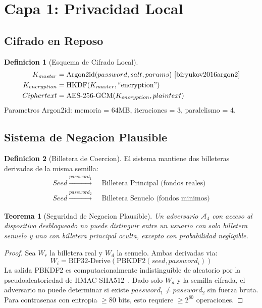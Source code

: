\documentclass[11pt]{article}
\theoremstyle{definition}
\newtheorem{definicion}{Definicion}[section]
\theoremstyle{plain}
\newtheorem{teorema}{Teorema}[section]
\theoremstyle{remark}
\begin{document}
\section{Capa 1: Privacidad Local}
\label{sec:layer1}

\subsection{Cifrado en Reposo}

\begin{definicion}[Esquema de Cifrado Local]
\begin{align}
K_{master} &= \text{Argon2id}(password, salt, params)~\cite{biryukov2016argon2} \\
K_{encryption} &= \text{HKDF}(K_{master}, \text{``encryption''}) \\
Ciphertext &= \text{AES-256-GCM}(K_{encryption}, plaintext)
\end{align}
Parametros Argon2id: memoria = 64MB, iteraciones = 3, paralelismo = 4.
\end{definicion}

\subsection{Sistema de Negacion Plausible}

\begin{definicion}[Billetera de Coercion]
El sistema mantiene dos billeteras derivadas de la misma semilla:
\begin{align}
Seed \xrightarrow{password_1} &\text{ Billetera Principal (fondos reales)} \\
Seed \xrightarrow{password_2} &\text{ Billetera Senuelo (fondos minimos)}
\end{align}
\end{definicion}

\begin{teorema}[Seguridad de Negacion Plausible]
\label{thm:deniability}
Un adversario $\mathcal{A}_4$ con acceso al dispositivo desbloqueado no puede distinguir entre un usuario con solo billetera senuelo y uno con billetera principal oculta, excepto con probabilidad negligible.
\end{teorema}

\begin{proof}
Sea $W_r$ la billetera real y $W_d$ la senuelo. Ambas derivadas via:
\begin{equation}
W_i = \text{BIP32-Derive}(\text{PBKDF2}(seed, password_i))
\end{equation}
La salida PBKDF2 es computacionalmente indistinguible de aleatorio por la pseudoaleatoriedad de HMAC-SHA512~\cite{krawczyk2010hmac}. Dado solo $W_d$ y la semilla cifrada, el adversario no puede determinar si existe $password_1 \neq password_2$ sin fuerza bruta. Para contrasenas con entropia $\geq 80$ bits, esto requiere $\geq 2^{80}$ operaciones.
\end{proof}
\end{document}
